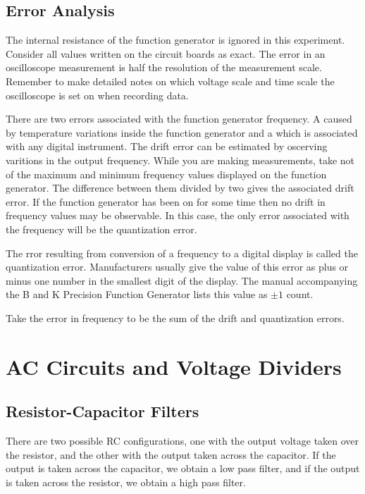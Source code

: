 \section{Error Analysis}

The internal resistance of the function generator is ignored in this experiment. Consider all values written on the circuit boards as exact. The error in an oscilloscope measurement is half the resolution of the measurement scale. Remember to make detailed notes on which voltage scale and time scale the oscilloscope is set on when recording data.

\noindent There are two errors associated with the function generator frequency. A  caused by temperature variations inside the function generator and a  which is associated with any digital instrument. The drift error can be estimated by oscerving varitions in the output frequency. While you are making measurements, take not of the maximum and minimum frequency values displayed on the function generator. The difference between them divided by two gives the associated drift error. If the function generator has been on for some time then no drift in frequency values may be observable. In this case, the only error associated with the frequency will be the quantization error.

\noindent The rror resulting from conversion of a frequency to a digital display is called the quantization error. Manufacturers usually give the value of this error as plus or minus one number in the smallest digit of the display. The manual accompanying the B and K Precision Function Generator lists this value as $\pm 1$ count.

\noindent Take the error in frequency to be the sum of the drift and quantization errors. 





\chapter{AC Circuits and Voltage Dividers}

\section{Resistor-Capacitor Filters}

There are two possible RC configurations, one with the output voltage taken over the resistor, and the other with the output taken across the capacitor. If the output is taken across the capacitor, we obtain a low pass filter, and if the output is taken across the resistor, we obtain a high pass filter.

